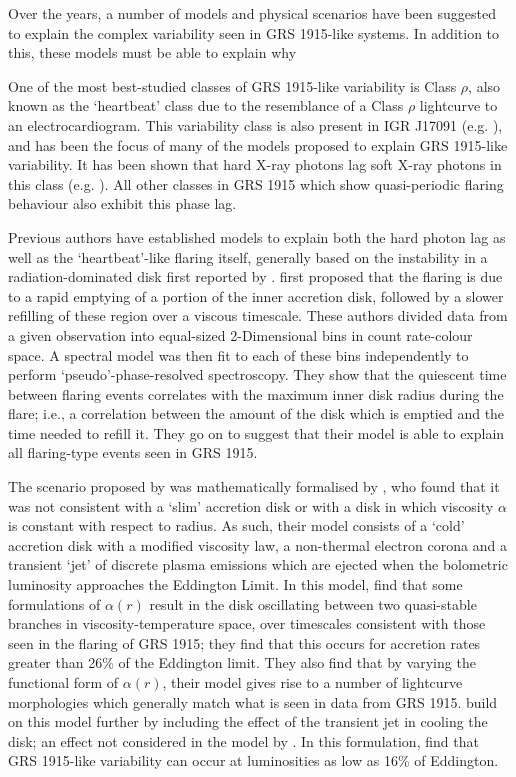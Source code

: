 \par Over the years, a number of models and physical scenarios have been suggested to explain the complex variability seen in GRS 1915-like systems.  In addition to this, these models must be able to explain why
\par One of the most best-studied classes of GRS 1915-like variability is Class $\rho$, also known as the `heartbeat' class due to the resemblance of a Class $\rho$ lightcurve to an electrocardiogram.  This variability class is also present in IGR J17091 (e.g. \citealp{Altamirano_IGR_FH}), and has been the focus of many of the models proposed to explain GRS 1915-like variability.  It has been shown that hard X-ray photons lag soft X-ray photons in this class (e.g. \citealp{Janiuk_Lag,Massaro_Lag}).  All other classes in GRS 1915 which show quasi-periodic flaring behaviour also exhibit this phase lag.
\par Previous authors have established models to explain both the hard photon lag as well as the `heartbeat'-like flaring itself, generally based on the instability in a radiation-dominated disk first reported by \citealp{Lightman_Instability}.  \citealp{Belloni_Model1} first proposed that the flaring is due to a rapid emptying of a portion of the inner accretion disk, followed by a slower refilling of these region over a viscous timescale.  These authors divided data from a given observation into equal-sized 2-Dimensional bins in count rate-colour space.  A spectral model was then fit to each of these bins independently to perform `pseudo'-phase-resolved spectroscopy.  They show that the quiescent time between flaring events correlates with the maximum inner disk radius during the flare; i.e., a correlation between the amount of the disk which is emptied and the time needed to refill it.  They go on to suggest that their model is able to explain all flaring-type events seen in GRS 1915.
\par The scenario proposed by \citealp{Belloni_Model1} was mathematically formalised by \citealp{Nayakshin_GRSModel}, who found that it was not consistent with a `slim' accretion disk \citep{Abramowicz_Slim} or with a disk in which viscosity $\alpha$ is constant with respect to radius.  As such, their model consists of a `cold' accretion disk with a modified viscosity law, a non-thermal electron corona and a transient `jet' of discrete plasma emissions which are ejected when the bolometric luminosity approaches the Eddington Limit.  In this model, \citealp{Nayakshin_GRSModel} find that some formulations of $\alpha(r)$ result in the disk oscillating between two quasi-stable branches in viscosity-temperature space, over timescales consistent with those seen in the flaring of GRS 1915; they find that this occurs for accretion rates greater than 26\% of the Eddington limit.  They also find that by varying the functional form of $\alpha(r)$, their model gives rise to a number of lightcurve morphologies which generally match what is seen in data from GRS 1915.  \citealp{Janiuk_RadInstab} build on this model further by including the effect of the transient jet in cooling the disk; an effect not considered in the model by \citealp{Nayakshin_GRSModel}.  In this formulation, \citealp{Janiuk_RadInstab} find that GRS 1915-like variability can occur at luminosities as low as 16\% of Eddington.
